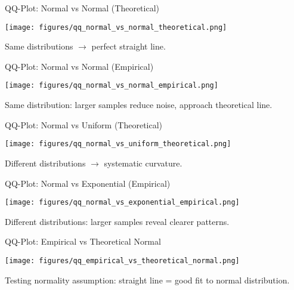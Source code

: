 \documentclass{beamer}
\newcommand{\1}{\mathbf{1}}
\begin{document}
\begin{frame}{QQ-Plot: Normal vs Normal (Theoretical)}
  \begin{center}
    \texttt{[image: figures/qq\_normal\_vs\_normal\_theoretical.png]}
  \end{center}
  \vspace{0.3em}
  Same distributions $\rightarrow$ perfect straight line.
\end{frame}

\begin{frame}{QQ-Plot: Normal vs Normal (Empirical)}
  \begin{center}
    \texttt{[image: figures/qq\_normal\_vs\_normal\_empirical.png]}
  \end{center}
  \vspace{0.3em}
  Same distribution: larger samples reduce noise, approach theoretical line.
\end{frame}

\begin{frame}{QQ-Plot: Normal vs Uniform (Theoretical)}
  \begin{center}
    \texttt{[image: figures/qq\_normal\_vs\_uniform\_theoretical.png]}
  \end{center}
  \vspace{0.3em}
  Different distributions $\rightarrow$ systematic curvature.
\end{frame}

\begin{frame}{QQ-Plot: Normal vs Exponential (Empirical)}
  \begin{center}
    \texttt{[image: figures/qq\_normal\_vs\_exponential\_empirical.png]}
  \end{center}
  \vspace{0.3em}
  Different distributions: larger samples reveal clearer patterns.
\end{frame}

\begin{frame}{QQ-Plot: Empirical vs Theoretical Normal}
  \begin{center}
    \texttt{[image: figures/qq\_empirical\_vs\_theoretical\_normal.png]}
  \end{center}
  \vspace{0.3em}
  Testing normality assumption: straight line = good fit to normal distribution.
\end{frame}
\end{document}
